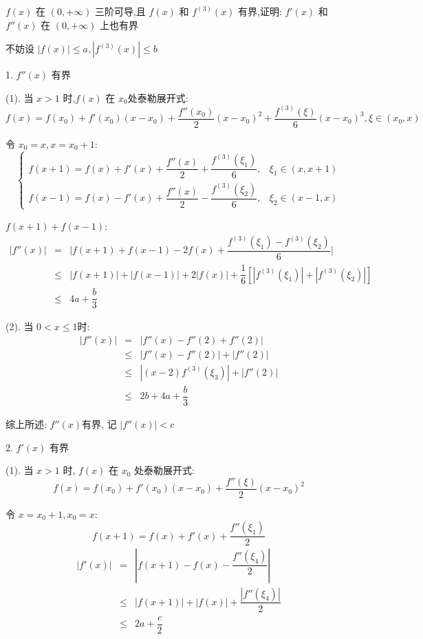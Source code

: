 \begin{proposition}
	$f(x)$ 在 $(0,+\infty)$ 三阶可导,且 $f(x)$ 和 $f^{(3)}(x)$ 有界,证明: $f'(x)$ 和 $f''(x)$ 在 $(0,+\infty)$ 上也有界
\end{proposition}
\begin{solution}

	不妨设 $|f(x)|\leq a,|f^{(3)}(x)|\leq b$

	1. $f''(x)$ 有界

	(1). 当 $x>1$ 时,$f(x)$ 在 $x_{0}$处泰勒展开式:
	$$f(x) = f(x_{0}) + f'(x_{0})(x-x_{0}) + \dfrac{f''(x_{0})}{2}(x-x_{0})^{2}+\dfrac{f^{(3)}(\xi)}{6}(x-x_{0})^{3}, \xi\in (x_{0}, x)$$

	令 $x_{0} = x, x = x_{0}+1$:
	$$\begin{cases}
		f(x+1) = f(x) + f'(x) + \dfrac{f''(x)}{2} + \dfrac{f^{(3)}(\xi_{1})}{6}, & \xi_{1}\in (x,x+1)\\
		f(x-1) = f(x) - f'(x) + \dfrac{f''(x)}{2} - \dfrac{f^{(3)}(\xi_{2})}{6}, & \xi_{2}\in (x-1,x)
	\end{cases}$$

	$f(x+1) + f(x-1)$:
	\begin{eqnarray*}
		|f''(x)| &   =  & \big|f(x+1) + f(x-1) -2f(x) + \dfrac{f^{(3)}(\xi_{1})-f^{(3)}(\xi_{2})}{6}\big|\\
				 & \leq & |f(x+1)| + |f(x-1)| + 2|f(x)| + \dfrac{1}{6}\left[|f^{(3)}(\xi_{1})|+|f^{(3)}(\xi_{2})|\right]\\
				 & \leq & 4a + \dfrac{b}{3}
	\end{eqnarray*}

	(2). 当 $0 < x \leq 1$时:
	\begin{eqnarray*}
		|f''(x)| &   =  & |f''(x) - f''(2) + f''(2)|\\
				 & \leq & |f''(x)-f''(2)| + |f''(2)|\\
				 & \leq & |(x-2)f^{(3)}(\xi_{3})| + |f''(2)|\\
				 & \leq & 2b + 4a + \dfrac{b}{3}
	\end{eqnarray*}

	综上所述: $f''(x)$有界, 记 $|f''(x)|<c$

	2. $f'(x)$ 有界

	(1). 当 $x>1$ 时, $f(x)$ 在 $x_{0}$ 处泰勒展开式:
	$$f(x) = f(x_{0}) + f'(x_{0})(x-x_{0}) + \dfrac{f''(\xi)}{2}(x-x_{0})^{2}$$

	令 $x = x_{0} + 1, x_{0} = x$:
	$$ f(x+1) = f(x) + f'(x) + \dfrac{f''(\xi_{1})}{2}$$
	\begin{eqnarray*}
		|f'(x)| &   =  & |f(x+1) - f(x) - \dfrac{f''(\xi_{4})}{2}|\\
				& \leq & |f(x+1)| + |f(x)| + \dfrac{|f''(\xi_{4})|}{2}\\
				& \leq & 2a + \dfrac{c}{2}
	\end{eqnarray*}
	

\end{solution}
